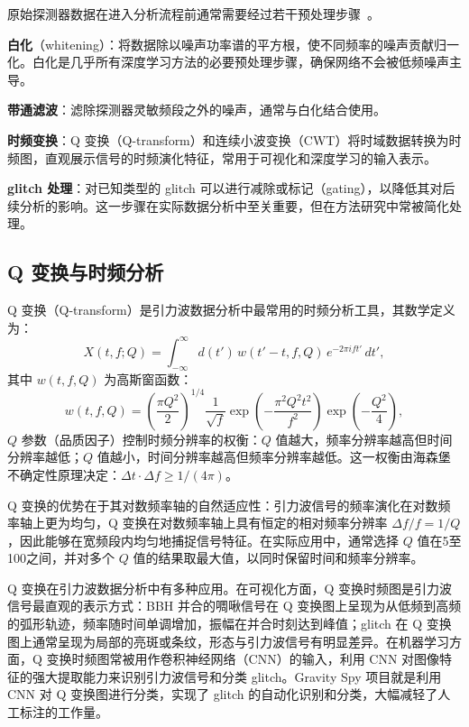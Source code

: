 原始探测器数据在进入分析流程前通常需要经过若干预处理步骤~\cite{Buikema2020O3noise}。

\textbf{白化}（whitening）：将数据除以噪声功率谱的平方根，使不同频率的噪声贡献归一化。白化是几乎所有深度学习方法的必要预处理步骤，确保网络不会被低频噪声主导。

\textbf{带通滤波}：滤除探测器灵敏频段之外的噪声，通常与白化结合使用。

\textbf{时频变换}：Q 变换（Q-transform）和连续小波变换（CWT）将时域数据转换为时频图，直观展示信号的时频演化特征，常用于可视化和深度学习的输入表示。

\textbf{glitch 处理}：对已知类型的 glitch 可以进行减除或标记（gating），以降低其对后续分析的影响。这一步骤在实际数据分析中至关重要，但在方法研究中常被简化处理。

\subsection{Q 变换与时频分析}

Q 变换（Q-transform）是引力波数据分析中最常用的时频分析工具，其数学定义为：
\begin{equation}
  X(t, f; Q) = \int_{-\infty}^{\infty} d(t') \, w(t'-t, f, Q) \, e^{-2\pi i f t'} \, dt',
\end{equation}
其中 $w(t, f, Q)$ 为高斯窗函数：
\begin{equation}
  w(t, f, Q) = \left(\frac{\pi Q^2}{2}\right)^{1/4} \frac{1}{\sqrt{f}} \exp\left(-\frac{\pi^2 Q^2 t^2}{f^2}\right) \exp\left(-\frac{Q^2}{4}\right),
\end{equation}
$Q$ 参数（品质因子）控制时频分辨率的权衡：$Q$ 值越大，频率分辨率越高但时间分辨率越低；$Q$ 值越小，时间分辨率越高但频率分辨率越低。这一权衡由海森堡不确定性原理决定：$\Delta t \cdot \Delta f \geq 1/(4\pi)$。

Q 变换的优势在于其对数频率轴的自然适应性：引力波信号的频率演化在对数频率轴上更为均匀，Q 变换在对数频率轴上具有恒定的相对频率分辨率 $\Delta f/f = 1/Q$，因此能够在宽频段内均匀地捕捉信号特征。在实际应用中，通常选择 $Q$ 值在5至100之间，并对多个 $Q$ 值的结果取最大值，以同时保留时间和频率分辨率。

Q 变换在引力波数据分析中有多种应用。在可视化方面，Q 变换时频图是引力波信号最直观的表示方式：BBH 并合的啁啾信号在 Q 变换图上呈现为从低频到高频的弧形轨迹，频率随时间单调增加，振幅在并合时刻达到峰值；glitch 在 Q 变换图上通常呈现为局部的亮斑或条纹，形态与引力波信号有明显差异。在机器学习方面，Q 变换时频图常被用作卷积神经网络（CNN）的输入，利用 CNN 对图像特征的强大提取能力来识别引力波信号和分类 glitch。Gravity Spy 项目就是利用 CNN 对 Q 变换图进行分类，实现了 glitch 的自动化识别和分类，大幅减轻了人工标注的工作量。

